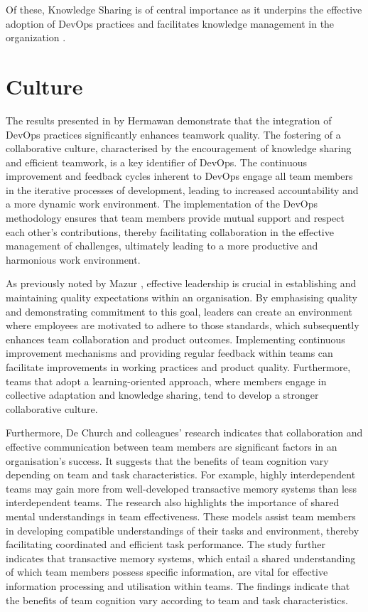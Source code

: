 Of these, Knowledge Sharing is of central importance as it underpins the effective adoption of \ac{DevOps} practices and facilitates knowledge management in the organization
\cite{Azad2023DevOps} .

\section{Culture}

The results presented in by Hermawan \cite{Hermawan2021DevOpsTeamwork} demonstrate that the integration of \ac{DevOps} practices significantly enhances teamwork quality. The fostering of a collaborative culture, characterised by the encouragement of knowledge sharing and efficient teamwork, is a key identifier of \ac{DevOps}. The continuous improvement and feedback cycles inherent to \ac{DevOps} engage all team members in the iterative processes of development, leading to increased accountability and a more dynamic work environment. The implementation of the \ac{DevOps} methodology ensures that team members provide mutual support and respect each other’s contributions, thereby facilitating collaboration in the effective management of challenges, ultimately leading to a more productive and harmonious work environment.

As previously noted by Mazur \cite{Mazur2023}, effective leadership is crucial in establishing and maintaining quality expectations within an organisation. By emphasising quality and demonstrating commitment to this goal, leaders can create an environment where employees are motivated to adhere to those standards, which subsequently enhances team collaboration and product outcomes. Implementing continuous improvement mechanisms and providing regular feedback within teams can facilitate improvements in working practices and product quality. Furthermore, teams that adopt a learning-oriented approach, where members engage in collective adaptation and knowledge sharing, tend to develop a stronger collaborative culture.

Furthermore, De Church and colleagues' research \cite{Dechurch2010} indicates that collaboration and effective communication between team members are significant factors in an organisation's success. It suggests that the benefits of team cognition vary depending on team and task characteristics. For example, highly interdependent teams may gain more from well-developed transactive memory systems than less interdependent teams. The research also highlights the importance of shared mental understandings in team effectiveness. These models assist team members in developing compatible understandings of their tasks and environment, thereby facilitating coordinated and efficient task performance. The study further indicates that transactive memory systems, which entail a shared understanding of which team members possess specific information, are vital for effective information processing and utilisation within teams. The findings indicate that the benefits of team cognition vary according to team and task characteristics.

